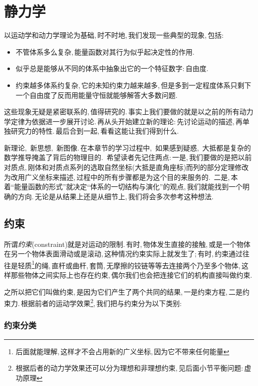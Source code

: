 \chapter{静力学}

以运动学和动力学理论为基础,\,时不时地,\,我们发现一些典型的现象,\,包括:
\begin{itemize}
	\item 不管体系多么复杂,\,能量函数对其行为似乎起决定性的作用.
	\item 似乎总是能够从不同的体系中抽象出它的一个特征数字:\,自由度.
	\item 约束越多体系约复杂,\,它的未知约束力越来越多,\,但是多到一定程度体系只剩下一个自由度了反而用能量守恒就能够解答大多数问题.
\end{itemize}

这些现象无疑是紧密联系的,\,值得研究的.\,事实上我们要做的就是以之前的所有动力学定律为依据进一步展开讨论.\,再从头开始建立新的理论:\,先讨论运动的描述,\,再单独研究力的特性.\,最后合到一起,\,看看这能让我们得到什么.

新理论,\, 新思想,\, 新图像.\,在本章节的学习过程中,\, 如果感到疑惑,\, 大抵都是复杂的数学推导掩盖了背后的物理目的.\, 希望读者先记住两点:\,一是,\,我们要做的是把以前对质点,\,刚体和对质点系列的选取自然坐标(大抵是直角座标)而列的部分定理修改为改用广义坐标来描述,\,过程中的所有步骤都是为这个目的来服务的.\, 二是,\,本着``能量函数的形式''就决定``体系的一切结构与演化''的观点,\,我们就能找到一个明确的方向.\,无论是从结果上还是从细节上,\,我们将会多次参考这种想法.

\section{约束}
所谓\emph{约束}(constraint)就是对运动的限制.\,有时,\,物体发生直接的接触,\,或是一个物体在另一个物体表面滑动或是滚动,\,这种情况约束实际上就发生了;\,有时,\,约束通过往往是轻质\footnote{后面就能理解,\,这样才不会占用新的广义坐标,\,因为它不带来任何能量}的绳,\,直杆或曲杆,\,套筒,\,无摩擦的铰链等等去连接两个乃至多个物体,\,这样那些物体之间实际上也存在约束,\,偶尔我们也会把连接它们的机构直接叫做约束.

之所以把它们叫做约束,\,是因为它们产生了两个共同的结果,\,一是约束方程,\,二是约束力.\,根据前者的运动学效果\footnote{根据后者的动力学效果还可以分为理想和非理想约束,\,见后面小节平衡问题:\,虚功原理},\,我们把与约束分为以下类别:

\subsection{约束分类}

